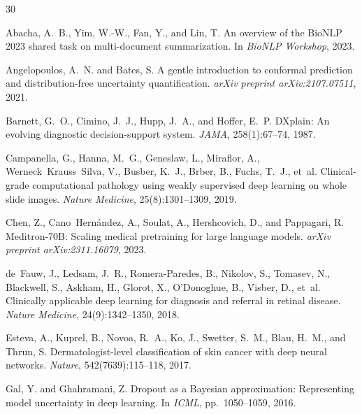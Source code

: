 \documentclass[11pt,a4paper]{article}
\begin{document}
\begin{thebibliography}{30}

Abacha, A.~B., Yim, W.-W., Fan, Y., and Lin, T.
\newblock An overview of the BioNLP 2023 shared task on multi-document summarization.
\newblock In \emph{BioNLP Workshop}, 2023.

Angelopoulos, A.~N. and Bates, S.
\newblock A gentle introduction to conformal prediction and distribution-free uncertainty quantification.
\newblock \emph{arXiv preprint arXiv:2107.07511}, 2021.

Barnett, G.~O., Cimino, J.~J., Hupp, J.~A., and Hoffer, E.~P.
\newblock DXplain: An evolving diagnostic decision-support system.
\newblock \emph{JAMA}, 258(1):67--74, 1987.

Campanella, G., Hanna, M.~G., Geneslaw, L., Miraflor, A., Werneck~Krauss~Silva, V., Busber, K.~J., Brber, B., Fuchs, T.~J., et~al.
\newblock Clinical-grade computational pathology using weakly supervised deep learning on whole slide images.
\newblock \emph{Nature Medicine}, 25(8):1301--1309, 2019.

Chen, Z., Cano~Hern{\'a}ndez, A., Soulat, A., Hershcovich, D., and Pappagari, R.
\newblock Meditron-70B: Scaling medical pretraining for large language models.
\newblock \emph{arXiv preprint arXiv:2311.16079}, 2023.

de~Fauw, J., Ledsam, J.~R., Romera-Paredes, B., Nikolov, S., Tomasev, N., Blackwell, S., Askham, H., Glorot, X., O'Donoghue, B., Visber, D., et~al.
\newblock Clinically applicable deep learning for diagnosis and referral in retinal disease.
\newblock \emph{Nature Medicine}, 24(9):1342--1350, 2018.

Esteva, A., Kuprel, B., Novoa, R.~A., Ko, J., Swetter, S.~M., Blau, H.~M., and Thrun, S.
\newblock Dermatologist-level classification of skin cancer with deep neural networks.
\newblock \emph{Nature}, 542(7639):115--118, 2017.

Gal, Y. and Ghahramani, Z.
\newblock Dropout as a Bayesian approximation: Representing model uncertainty in deep learning.
\newblock In \emph{ICML}, pp.\ 1050--1059, 2016.


\end{thebibliography}
\end{document}
